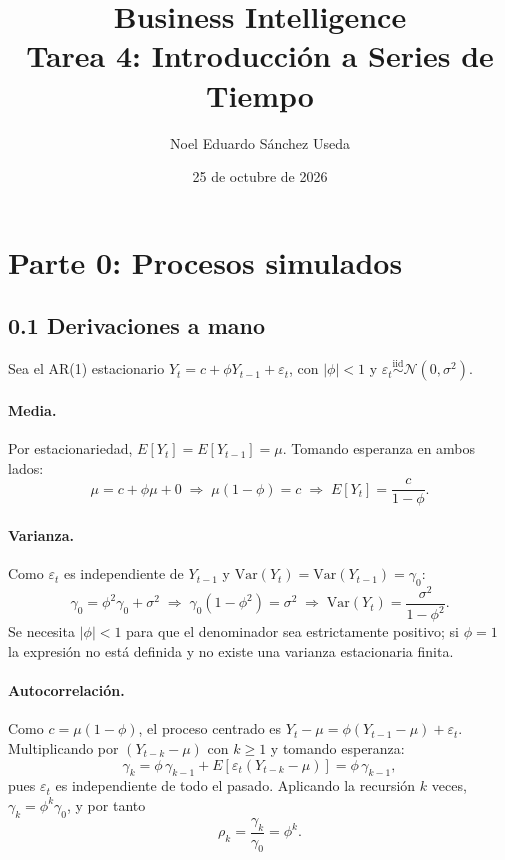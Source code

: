 \documentclass[11pt]{article}
\title{Business Intelligence\\Tarea 4: Introducci\'on a Series de Tiempo}
\author{Noel Eduardo Sánchez Useda}
\date{25 de octubre de 2026}
\begin{document}
\maketitle

\section*{Parte 0: Procesos simulados}

\subsection*{0.1 Derivaciones a mano}

Sea el AR(1) estacionario $Y_t = c + \phi Y_{t-1} + \varepsilon_t$, con
$|\phi|<1$ y $\varepsilon_t \overset{\text{iid}}{\sim} \mathcal{N}(0,\sigma^2)$.

\paragraph{Media.} Por estacionariedad, $E[Y_t]=E[Y_{t-1}]=\mu$. Tomando
esperanza en ambos lados:
\[
\mu = c + \phi\mu + 0 \;\Longrightarrow\; \mu(1-\phi)=c
\;\Longrightarrow\; E[Y_t]=\frac{c}{1-\phi}.
\]

\paragraph{Varianza.} Como $\varepsilon_t$ es independiente de $Y_{t-1}$ y
$\mathrm{Var}(Y_t)=\mathrm{Var}(Y_{t-1})=\gamma_0$:
\[
\gamma_0 = \phi^2\gamma_0 + \sigma^2
\;\Longrightarrow\; \gamma_0(1-\phi^2)=\sigma^2
\;\Longrightarrow\; \mathrm{Var}(Y_t)=\frac{\sigma^2}{1-\phi^2}.
\]
Se necesita $|\phi|<1$ para que el denominador sea estrictamente positivo; si
$\phi=1$ la expresi\'on no est\'a definida y no existe una varianza
estacionaria finita.

\paragraph{Autocorrelaci\'on.} Como $c=\mu(1-\phi)$, el proceso centrado es
$Y_t-\mu=\phi(Y_{t-1}-\mu)+\varepsilon_t$. Multiplicando por $(Y_{t-k}-\mu)$
con $k\ge 1$ y tomando esperanza:
\[
\gamma_k = \phi\,\gamma_{k-1} + E[\varepsilon_t(Y_{t-k}-\mu)] = \phi\,\gamma_{k-1},
\]
pues $\varepsilon_t$ es independiente de todo el pasado. Aplicando la
recursi\'on $k$ veces, $\gamma_k=\phi^k\gamma_0$, y por tanto
\[
\rho_k=\frac{\gamma_k}{\gamma_0}=\phi^k.
\]
\end{document}
